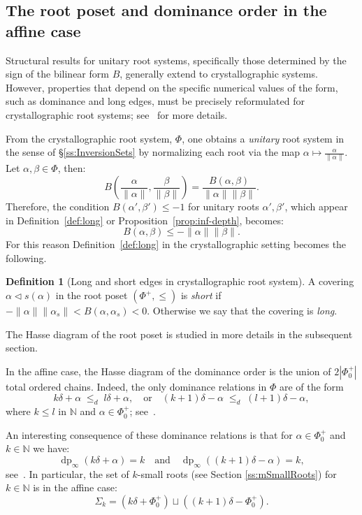 \documentclass{amsart}
\theoremstyle{definition}
\newtheorem{Definition}[Theorem]{Definition}
\newcommand{\dep}{\operatorname{dp}}
\begin{document}
\subsection{The root poset and dominance order in the affine case} Structural results for unitary root systems, specifically those determined by the sign of the bilinear form $B$, generally extend to crystallographic systems. However, properties that depend on the specific numerical values of the form, such as dominance and long edges, must be precisely reformulated for crystallographic root systems; see~\cite[Example 3.9]{DH} for more details. 


From the crystallographic root system, $\Phi$, one obtains a {\em unitary} root system in the sense of \S\ref{ss:InversionSets} by normalizing each root via the map $\alpha\mapsto \frac{\alpha}{\|\alpha\|}$. Let $\alpha,\beta\in\Phi$, then:     
$$
B\left(\frac{\alpha}{\|\alpha\|},\frac{\beta}{\|\beta\|}\right) = \frac{B(\alpha,\beta)}{\|\alpha\|\|\beta\|}.
$$
Therefore, the condition $B(\alpha',\beta')\leq -1$ for unitary roots $\alpha',\beta'$, which appear in Definition~\ref{def:long} or Proposition~\ref{prop:inf-depth}, becomes:  $$B(\alpha,\beta)\leq -\|\alpha\|\|\beta\|.$$ 
For this reason Definition~\ref{def:long} in the crystallographic setting becomes the following.

\begin{Definition}[Long and short edges in crystallographic root system] A covering $\alpha\lhd s(\alpha)$ in the root poset $(\Phi^+,\leq)$ is \textit{short} if $-\|\alpha\| \|\alpha_s\| < B(\alpha, \alpha_s)<0$. Otherwise we say that the covering is \textit{long}.
\end{Definition}

The Hasse diagram of the root poset is studied in more details in the subsequent section. 

\smallskip
In the affine case, the Hasse diagram of the dominance order is the union of $2|\Phi_0^+|$ total ordered chains. Indeed, the only dominance relations in  $\Phi$ are of the form
$$
 k\delta +\alpha \;\leq_d\;  l\delta+\alpha,
\quad
\text{or} \quad 
 (k+1)\delta -\alpha\;\leq_d\;  (l+1)\delta - \alpha,
$$
where $k\leq l$ in $\mathbb N$ and $\alpha\in\Phi_0^+$; see~\cite[Example 3.9]{DH}. 

An interesting consequence of these dominance relations is that for $\alpha\in\Phi_0^+$ and $k\in\mathbb N$ we have:
$$
\dep_\infty(k\delta+\alpha)=k\quad\textrm{and}\quad\dep_\infty((k+1)\delta-\alpha)=k,
$$
see~\cite[Example 3.9, Eq.($\diamond$)]{DH}. In particular, the set of $k$-small roots (see Section \ref{ss:mSmallRoots}) for $k\in\mathbb N$ is in the affine case:
\begin{equation}
\label{eq:mSmall}
\Sigma_k=\left(k\delta+\Phi^+_0\right)\sqcup \left((k+1)\delta-\Phi_0^+\right).
\end{equation}
\end{document}
